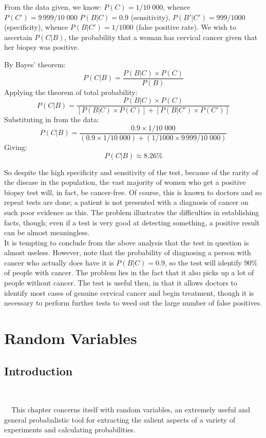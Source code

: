 \documentclass[12pt,a4paper]{article}
\begin{document}
From the data given, we know: $P(C) = 1/10\;000$, whence $P(C') = 9\,999/10\;000$ $P(B|C) = 0.9$ (sensitivity),  $P(B'|C') = 999/1000$ (specificity), whence $P(B|C') = 1/1000$ (false positive rate). We wish to ascertain $P(C|B)$, the probability that a woman has cervical cancer given that her biopsy was positive.\par
\vspace{12pt}

By Bayes' theorem:
$$P(C|B) = \frac{P(B|C) \times P(C)}{P(B)}$$
Applying the theorem of total probability:
$$P(C|B) = \frac{P(B|C) \times P(C)}{[P(B|C) \times P(C)] + [P(B|C') \times P(C')]}$$
Substituting in from the data:
$$P(C|B) = \frac{0.9 \times 1/10\;000}{(0.9 \times 1/10\;000) + (1/1000 \times 9\,999/10\;000)}$$
Giving:
$$P(C|B) \approx 8.26\%$$

So despite the high specificity and sensitivity of the test, because of the rarity of the disease in the population, the vast majority of women who get a positive biopsy test will, in fact, be cancer-free. Of course, this is known to doctors and so repeat tests are done; a patient is not presented with a diagnosis of cancer on such poor evidence as this. The problem illustrates the difficulties in establishing facts, though; even if a test is very good at detecting something, a positive result can be almost meaningless.\\
\indent It is tempting to conclude from the above analysis that the test in question is almost useless. However, note that the probability of diagnosing a person with cancer who actually does have it is $P(B|C) = 0.9$, so the test will identify 90\% of people with cancer. The problem lies in the fact that it also picks up a lot of people without cancer. The test is useful then, in that it allows doctors to identify most cases of genuine cervical cancer and begin treatment, though it is necessary to perform further tests to weed out the large number of false positives.

\clearpage
\section{Random Variables}

\subsection{Introduction}$\;$

$\quad$This chapter concerns itself with random variables, an extremely useful and general probabalistic tool for extracting the salient aspects of a variety of experiments and calculating probabilities.
\end{document}
